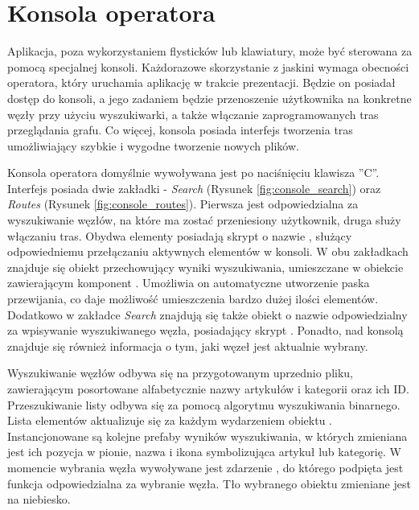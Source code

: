 \section{Konsola operatora}
Aplikacja, poza wykorzystaniem flysticków lub klawiatury, może być sterowana za pomocą specjalnej konsoli. Każdorazowe skorzystanie z jaskini wymaga obecności operatora, który uruchamia aplikację w trakcie prezentacji. Będzie on posiadał dostęp do konsoli, a jego zadaniem będzie przenoszenie użytkownika na konkretne węzły przy użyciu wyszukiwarki, a także włączanie zaprogramowanych tras przeglądania grafu. Co więcej, konsola posiada interfejs tworzenia tras umożliwiający szybkie i wygodne tworzenie nowych plików. 

Konsola operatora domyślnie wywoływana jest po naciśnięciu klawisza ''C''. Interfejs posiada dwie zakładki - \textit{Search} (Rysunek \ref{fig:console_search}) oraz \textit{Routes} (Rysunek \ref{fig:console_routes}). Pierwsza jest odpowiedzialna za wyszukiwanie węzłów, na które ma zostać przeniesiony użytkownik, druga służy włączaniu tras. Obydwa elementy posiadają skrypt o nazwie , służący odpowiedniemu przełączaniu aktywnych elementów w konsoli. W obu zakładkach znajduje się obiekt przechowujący wyniki wyszukiwania, umieszczane w obiekcie zawierającym komponent  . Umożliwia on automatyczne utworzenie paska przewijania, co daje możliwość umieszczenia bardzo dużej ilości elementów.  Dodatkowo w zakładce \textit{Search} znajdują się także obiekt o nazwie   odpowiedzialny za wpisywanie wyszukiwanego węzła, posiadający skrypt  . Ponadto, nad konsolą znajduje się również informacja o tym, jaki węzeł jest aktualnie wybrany.


Wyszukiwanie węzłów odbywa się na przygotowanym uprzednio pliku, zawierającym posortowane alfabetycznie nazwy artykułów i kategorii oraz ich ID. Przeszukiwanie listy odbywa się za pomocą algorytmu wyszukiwania binarnego. Lista elementów aktualizuje się za każdym wydarzeniem   obiektu  . Instancjonowane są kolejne prefaby wyników wyszukiwania, w których zmieniana jest ich pozycja w pionie, nazwa i ikona symbolizująca artykuł lub kategorię. W momencie wybrania węzła wywoływane jest zdarzenie  , do którego podpięta jest funkcja   odpowiedzialna za wybranie węzła. Tło wybranego obiektu zmieniane jest na niebiesko.

